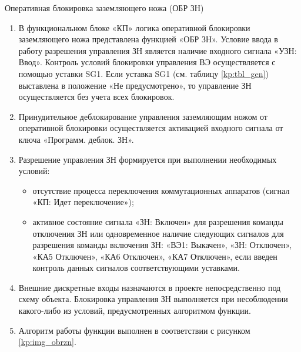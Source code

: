 \begin{enumerate}
{\begin{enumerate}
\end{enumerate}


\item Оперативная блокировка заземляющего ножа (ОБР ЗН)

\begin{enumerate}

\item
В функциональном блоке «КП» логика оперативной блокировки заземляющего ножа представлена функцией «ОБР ЗН». Условие ввода в работу разрешения управления ЗН является наличие входного сигнала «УЗН: Ввод». Контроль условий блокировки управления ВЭ осуществляется с помощью уставки SG1. Если уставка SG1 (см. таблицу \ref{kp:tbl_gen}) выставлена в положение «Не предусмотрено», то управление ЗН осуществляется без учета всех блокировок.

\item
Принудительное деблокирование управления заземляющим ножом от оперативной блокировки осуществляется активацией входного сигнала от ключа «Программ. деблок. ЗН».

\item
Разрешение управления ЗН формируется при выполнении необходимых условий:
\begin{itemize}
	\item отсутствие процесса переключения коммутационных аппаратов (сигнал «КП: Идет переключение»);
	\item активное состояние сигнала «ЗН: Включен» для разрешения команды отключения ЗН или одновременное наличие следующих сигналов для разрешения команды включения ЗН: «ВЭ1: Выкачен», «ЗН: Отключен», «КА5 Отключен», «КА6 Отключен», «КА7 Отключен», если введен контроль данных сигналов соответствующими уставками.
\end{itemize}

\item\sloppy
Внешние дискретные входы назначаются в проекте непосредственно под схему объекта. Блокировка управления ЗН выполняется при несоблюдении какого-либо из условий, предусмотренных алгоритмом функции.

\item
Алгоритм работы функции выполнен в соответствии с рисунком \ref{kp:img_obrzn}. 


\end{enumerate}}
\end{enumerate}

